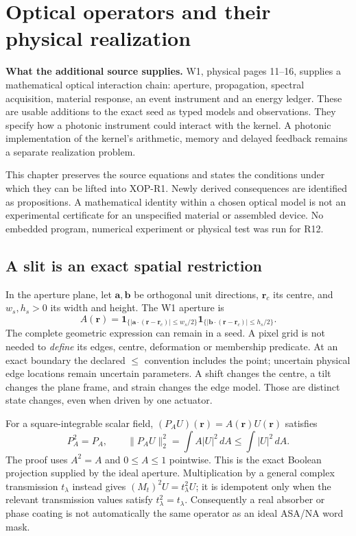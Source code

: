 \section{Optical operators and their physical realization}
\label{sec:want-optics}

\begin{panel}
\textbf{What the additional source supplies.}
W1, physical pages 11--16, supplies a mathematical optical interaction chain:
aperture, propagation, spectral acquisition, material response, an event
instrument and an energy ledger. These are usable additions to the exact seed
as typed models and observations. They specify how a photonic instrument could
interact with the kernel. A photonic implementation of the kernel's arithmetic,
memory and delayed feedback remains a separate realization problem.
\end{panel}

This chapter preserves the source equations and states the conditions under
which they can be lifted into XOP-R1. Newly derived consequences are identified
as propositions. A mathematical identity within a chosen optical model is not
an experimental certificate for an unspecified material or assembled device.
No embedded program, numerical experiment or physical test was run for R12.

\subsection{A slit is an exact spatial restriction}

In the aperture plane, let $\mathbf a,\mathbf b$ be orthogonal unit directions,
$\mathbf r_c$ its centre, and $w_s,h_s>0$ its width and height. The W1 aperture is
\begin{equation}
 A(\mathbf r)=
 \mathbf1_{\{|\mathbf a\cdot(\mathbf r-\mathbf r_c)|\le w_s/2\}}
 \mathbf1_{\{|\mathbf b\cdot(\mathbf r-\mathbf r_c)|\le h_s/2\}}.
 \label{eq:want-aperture}
\end{equation}
The complete geometric expression can remain in a seed. A pixel grid is not
needed to \emph{define} its edges, centre, deformation or membership predicate.
At an exact boundary the declared $\le$ convention includes the point; uncertain
physical edge locations remain uncertain parameters. A shift changes the
centre, a tilt changes the plane frame, and strain changes the edge model.
Those are distinct state changes, even when driven by one actuator.

For a square-integrable scalar field, $(P_AU)(\mathbf r)=A(\mathbf r)U(\mathbf r)$
satisfies
\begin{equation}
 P_A^2=P_A,\qquad
 \|P_AU\|_2^2=\int A|U|^2\,dA\le\int |U|^2\,dA.
 \label{eq:want-slit-contraction}
\end{equation}
The proof uses $A^2=A$ and $0\le A\le1$ pointwise. This is the exact Boolean
projection supplied by the ideal aperture. Multiplication by a general complex
transmission $t_\lambda$ instead gives $(M_t)^2U=t_\lambda^2U$; it is idempotent
only when the relevant transmission values satisfy $t_\lambda^2=t_\lambda$.
Consequently a real absorber or phase coating is not automatically the same
operator as an ideal ASA/NA word mask.


